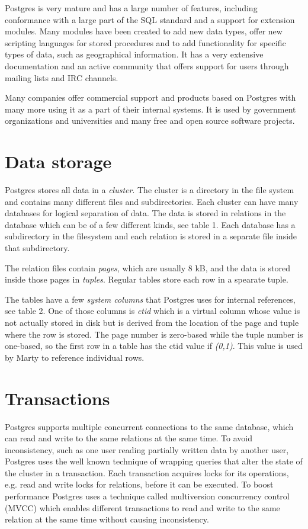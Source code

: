 \documentclass[a4paper,12pt,twoside,BCOR=10mm]{scrbook}
\begin{document}
Postgres is very mature and has a large number of features, including conformance with a large part of the SQL standard and a support for extension modules. Many modules have been created to add new data types, offer new scripting languages for stored procedures and to add functionality for specific types of data, such as geographical information. It has a very extensive documentation and an active community that offers support for users through mailing lists and IRC channels.

Many companies offer commercial support and products based on Postgres with many more using it as a part of their internal systems. It is used by government organizations and universities and many free and open source software projects.

\section{Data storage}
Postgres stores all data in a \textit{cluster}. The cluster is a directory in the file system and contains many different files and subdirectories. Each cluster can have many databases for logical separation of data. The data is stored in relations in the database which can be of a few different kinds, see table 1. Each database has a subdirectory in the filesystem and each relation is stored in a separate file inside that subdirectory.


The relation files contain \textit{pages}, which are usually 8 kB, and the data is stored inside those pages in \textit{tuples}. Regular tables store each row in a spearate tuple.


The tables have a few \textit{system columns} that Postgres uses for internal references, see table 2. One of those columns is \textit{ctid} which is a virtual column whose value is not actually stored in disk but is derived from the location of the page and tuple where the row is stored. The page number is zero-based while the tuple number is one-based, so the first row in a table has the ctid value if \textit{(0,1)}. This value is used by Marty to reference individual rows.


\section{Transactions}
Postgres supports multiple concurrent connections to the same database, which can read and write to the same relations at the same time. To avoid inconsistency, such as one user reading partially written data by another user, Postgres uses the well known technique of wrapping queries that alter the state of the cluster in a transaction. Each transaction acquires locks for its operations, e.g. read and write locks for relations, before it can be executed. To boost performance Postgres uses a technique called multiversion concurrency control (MVCC) which enables different transactions to read and write to the same relation at the same time without causing inconsistency.
\end{document}
